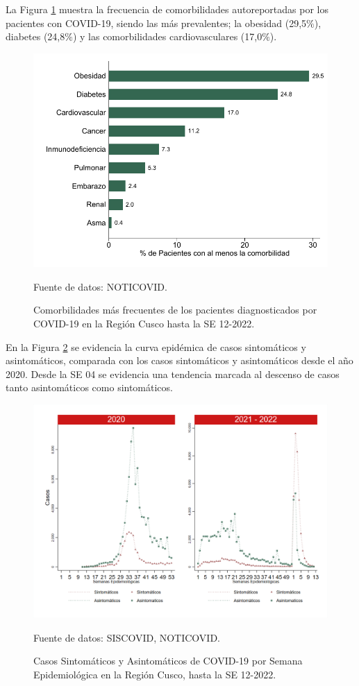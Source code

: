 \documentclass[12pt,a4paper,openany]{book}
\begin{document}
La Figura \ref{fig:comorbilidades} muestra la frecuencia de comorbilidades autoreportadas por los pacientes con COVID-19, siendo las más prevalentes; la obesidad (29,5$\%$), diabetes (24,8$\%$) y las comorbilidades cardiovasculares (17,0$\%$).  
\begin{figure}[h]
	\caption{Comorbilidades más frecuentes de los pacientes diagnosticados por COVID-19 en la Región Cusco hasta la SE 12-2022. }\label{fig:comorbilidades}
	\begin{center}
		\includegraphics[width=0.65\linewidth]{../figuras/figura_comorbilidad.pdf}
	\end{center}
	{\footnotesize {Fuente de datos: NOTICOVID.}}
\end{figure}
\clearpage
 En la Figura \ref{fig:sintomaticos_asintomati} se evidencia la curva epidémica de casos sintomáticos y asintomáticos, comparada con los casos sintomáticos y asintomáticos desde el año 2020. Desde la SE 04 se evidencia una tendencia marcada al descenso de casos tanto asintomáticos como sintomáticos. 
 
\begin{figure}[h]
	\caption{Casos Sintomáticos y Asintomáticos de COVID-19 por Semana Epidemiológica en la Región Cusco, hasta la SE 12-2022.  }\label{fig:sintomaticos_asintomati}
	
	\begin{center}
		\includegraphics[width=0.75\linewidth]{../figuras/sintomaticos_20_21_22.png}
	\end{center}
	{\footnotesize {Fuente de datos: SISCOVID, NOTICOVID.}}
\end{figure}
\clearpage
\end{document}

